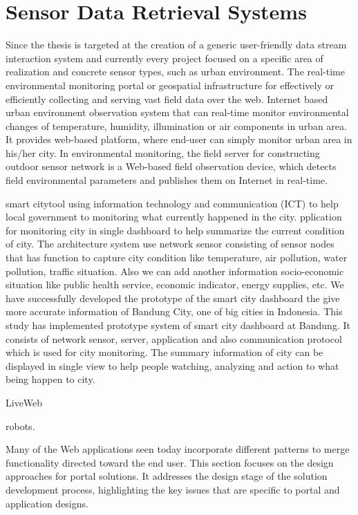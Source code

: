 \section{Sensor Data Retrieval Systems}
 Since the thesis is targeted at the creation of a generic user-friendly data stream interaction system and currently every project focused on a specific area of realization and concrete sensor types, such as urban environment\cite{song2010real}. The real-time environmental monitoring portal or geospatial infrastructure for effectively or
 efficiently collecting and serving vast field data over the web. Internet based urban
environment observation system that can real-time monitor environmental changes of temperature, humidity, illumination or air components in urban area. It provides web-based platform, where end-user can simply monitor urban area in his/her city. In environmental monitoring, the field server for constructing outdoor sensor network is a Web-based field observation device, which detects field environmental parameters and publishes them on Internet in real-time.

 smart city\cite{6588063}tool using information technology and communication (ICT) to help local government to monitoring what currently happened in the city. pplication for monitoring city in single dashboard to help summarize the current condition of city. The architecture system use network sensor consisting of sensor nodes that has
function to capture city condition like temperature, air pollution,
water pollution, traffic situation. Also we can add another information socio-economic situation like public health service, economic indicator, energy supplies, etc. We have successfully developed the prototype of the smart city dashboard the give
more accurate information of Bandung City, one of big cities in Indonesia.
This study has implemented prototype system of smart city dashboard at Bandung. It consists of network sensor, server, application and also communication protocol which is used for
city monitoring. The summary information of city can be displayed in single view to help people watching, analyzing and action to what being happen to city.
 
 LiveWeb\cite{yang2011liveweb}

 robots\cite{bendel2013service}.

Many of the Web applications seen today incorporate different patterns to merge
functionality directed toward the end user. This section focuses on the design approaches for portal solutions. 
It addresses the design stage of the solution development process, highlighting the key issues that are specific to portal and application designs.

